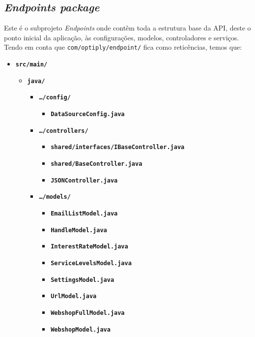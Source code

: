 \newpage

\subsection{\textit{\textit{Endpoints} package}}\label{endp}

Este é o subprojeto \textit{Endpoints} onde contêm toda a estrutura base da API, deste o ponto inicial da aplicação, às configurações, modelos, controladores e serviços. Tendo em conta que \texttt{com/optiply/endpoint/} fica como reticências, temos que:

\begin{itemize}
  \item \texttt{\textbf{src/main/}}\begin{itemize}
      \item \texttt{\textbf{java/}}\begin{itemize}
          \item \texttt{\textbf{\ldots/config/}}\begin{itemize}
              \item \texttt{\textbf{DataSourceConfig.java}}
            \end{itemize}
          \item \texttt{\textbf{\ldots/controllers/}}\begin{itemize}
              \item \texttt{\textbf{shared/interfaces/IBaseController.java}}
              \item \texttt{\textbf{shared/BaseController.java}}
              \item \texttt{\textbf{JSONController.java}}
            \end{itemize}
          \item \texttt{\textbf{\ldots/models/}}\begin{itemize}
              \item \texttt{\textbf{EmailListModel.java}}
              \item \texttt{\textbf{HandleModel.java}}
              \item \texttt{\textbf{InterestRateModel.java}}
              \item \texttt{\textbf{ServiceLevelsModel.java}}
              \item \texttt{\textbf{SettingsModel.java}}
              \item \texttt{\textbf{UrlModel.java}}
              \item \texttt{\textbf{WebshopFullModel.java}}
              \item \texttt{\textbf{WebshopModel.java}}

\end{itemize}
\end{itemize}
\end{itemize}
\end{itemize}
